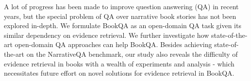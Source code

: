 A lot of progress has been made to improve question answering (QA) in recent years, but the special problem of QA over narrative book stories has not been explored in-depth. We formulate BookQA as an open-domain QA task given its similar dependency on evidence retrieval. We further investigate how state-of-the-art open-domain QA approaches can help BookQA. Besides achieving state-of-the-art on the NarrativeQA benchmark, our study also reveals the difficulty of evidence retrieval in books with a wealth of experiments and analysis - which necessitates future effort on novel solutions for evidence retrieval in BookQA.
